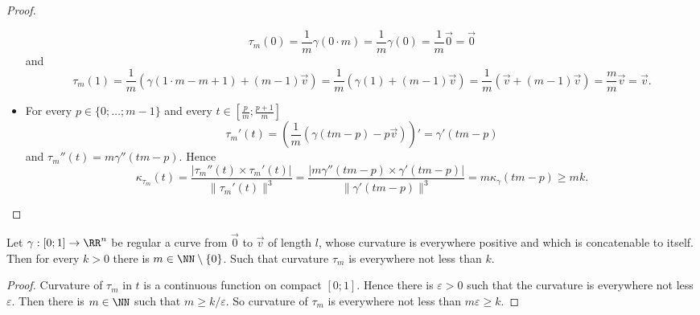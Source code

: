 \documentclass[12pt,a4paper]{article}
\begin{document}
\begin{problem}{72}
\begin{proof}
\begin{itemize}
                    \[\tau_m(0) = \frac{1}{m} \gamma(0 \cdot m) = \frac{1}{m} \gamma(0) = \frac{1}{m} \vec{0} = \vec{0}\]
                    and
                    \[
                        \tau_m(1)
                        = \frac{1}{m}(\gamma(1 \cdot m - m + 1) + (m-1)\vec{v})
                        = \frac{1}{m}(\gamma(1) + (m-1)\vec{v})
                        = \frac{1}{m}(\vec{v} + (m-1)\vec{v})
                        = \frac{m}{m}\vec{v}
                        = \vec{v}.
                    \]
                \item For every $p \in \{0; \dots; m-1\}$ and every $t \in [\frac{p}{m}; \frac{p+1}{m}]$
                    \[
                        \tau_m'(t)
                        = \left(\frac{1}{m} (\gamma(tm-p) - p\vec{v})\right)'
                        = \gamma'(tm-p)
                    \]
                    and $\tau_m''(t) = m \gamma''(tm-p)$. Hence
                    \[
                        \kappa_{\tau_m}(t)
                        = \frac{|\tau_m''(t) \times \tau_m'(t)|}{\|\tau_m'(t)\|^3}
                        = \frac{|m\gamma''(tm-p) \times \gamma'(tm-p)|}{\|\gamma'(tm-p)\|^3}
                        = m \kappa_{\gamma}(tm-p) \geqslant mk.
                    \]
            \end{itemize}
        \end{proof}

        \begin{corollary}
            Let $\gamma: [0; 1] \to \RR^n$ be regular a curve from $\vec{0}$ to $\vec{v}$ of length $l$, whose curvature is everywhere positive and which is concatenable to itself. Then for every $k > 0$ there is $m \in \NN \setminus \{0\}$. Such that curvature $\tau_m$ is everywhere not less than $k$.
        \end{corollary}

        \begin{proof}
            Curvature of $\tau_m$ in $t$ is a continuous function on compact $[0; 1]$. Hence there is $\varepsilon > 0$ such that the curvature is everywhere not less $\varepsilon$. Then there is $m \in \NN$ such that $m \geqslant k/\varepsilon$. So curvature of $\tau_m$ is everywhere not less than $m \varepsilon \geqslant k$.
        \end{proof}


\end{problem}
\end{document}
